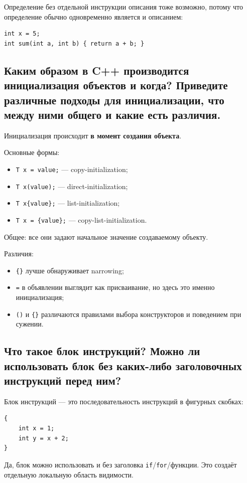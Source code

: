 Определение без отдельной инструкции описания тоже возможно, потому что определение обычно одновременно является и описанием:
\begin{verbatim}
int x = 5;
int sum(int a, int b) { return a + b; }
\end{verbatim}


\subsection{Каким образом в C++ производится инициализация объектов и когда? Приведите различные подходы для инициализации, что между ними общего и какие есть различия.}

Инициализация происходит \textbf{в момент создания объекта}.

Основные формы:
\begin{itemize}
    \item \texttt{T x = value;} --- copy-initialization;
    \item \texttt{T x(value);} --- direct-initialization;
    \item \texttt{T x\{value\};} --- list-initialization;
    \item \texttt{T x = \{value\};} --- copy-list-initialization.
\end{itemize}

Общее: все они задают начальное значение создаваемому объекту.

Различия:
\begin{itemize}
    \item \texttt{\{\}} лучше обнаруживает narrowing;
    \item \texttt{=} в объявлении выглядит как присваивание, но здесь это именно инициализация;
    \item \texttt{()} и \texttt{\{\}} различаются правилами выбора конструкторов и поведением при сужении.
\end{itemize}


\subsection{Что такое блок инструкций? Можно ли использовать блок без каких-либо заголовочных инструкций перед ним?}

Блок инструкций --- это последовательность инструкций в фигурных скобках:
\begin{verbatim}
{
    int x = 1;
    int y = x + 2;
}
\end{verbatim}

Да, блок можно использовать и без заголовка \texttt{if}/\texttt{for}/функции. Это создаёт отдельную локальную область видимости.


